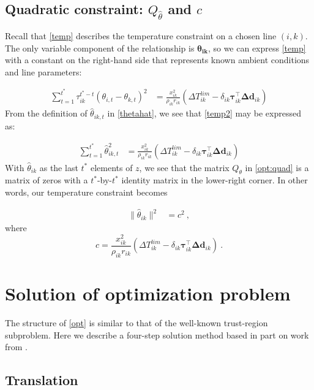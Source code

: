\documentclass[conference]{IEEEtran}
\begin{document}
\subsection{Quadratic constraint: $Q_{\hat{\theta}}$ and $c$}

Recall that \eqref{temp} describes the temperature constraint on a chosen line $(i,k)$. The only variable component of the relationship is $\boldsymbol{\theta_{ik}}$, so we can express \eqref{temp} with a constant on the right-hand side that represents known ambient conditions and line parameters:

\begin{align}\label{temp2}
\sum_{t=1}^{t^*} \tau_{ik}^{t^*-t} (\theta_{i,t} - \theta_{k,t})^2 &=  \frac{x_{ik}^2}{\rho_{ik} r_{ik}} \left(\Delta T_{ik}^{lim} - \delta_{ik} \boldsymbol{\tau}_{ik}^\top \boldsymbol{\Delta d}_{ik}\right)
\end{align}
From the definition of $\hat{\theta}_{ik,t}$ in \eqref{thetahat}, we see that \eqref{temp2} may be expressed as:

\begin{align}
\sum_{t=1}^{t^*} \hat{\theta}_{ik,t}^2 &=  \frac{x_{ik}^2}{\rho_{ik} r_{ik}} \left(\Delta T_{ik}^{lim} - \delta_{ik} \boldsymbol{\tau}_{ik}^\top \boldsymbol{\Delta d}_{ik}\right)
\end{align}
With $\hat{\theta}_{ik}$ as the last $t^*$ elements of $z$, we see that the matrix $Q_{\theta}$ in \eqref{opt:quad} is a matrix of zeros with a $t^*$-by-$t^*$ identity matrix in the lower-right corner. In other words, our temperature constraint becomes

\begin{align*}
\lVert \hat{\theta}_{ik}\rVert^2 &= c^2~,
\end{align*}
where $$c = \frac{x_{ik}^2}{\rho_{ik} r_{ik}} \left(\Delta T_{ik}^{lim} - \delta_{ik} \boldsymbol{\tau}_{ik}^\top \boldsymbol{\Delta d}_{ik}\right)~. $$

\section{Solution of optimization problem}

The structure of \eqref{opt} is similar to that of the well-known trust-region subproblem. Here we describe a four-step solution method based in part on work from \cite{bienstock2014}.

\subsection{Translation}
\end{document}
